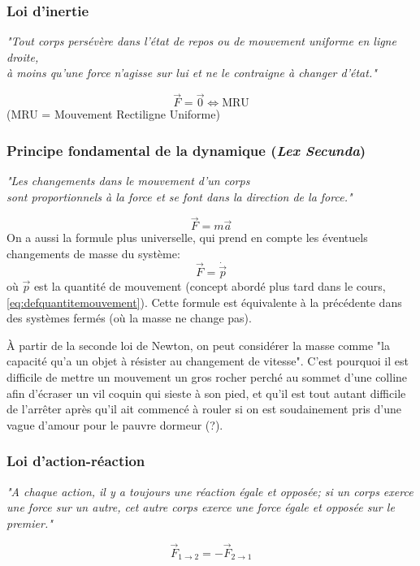 \documentclass{article}
\numberwithin{equation}{section}
\begin{document}
\subsubsection{Loi d'inertie}
\begin{center}
	\emph{"Tout corps persévère dans l'état de repos ou de mouvement uniforme en ligne droite, \\
	 à moins qu'une force n'agisse sur lui et ne le contraigne à changer d'état."}
\end{center}
\begin{equation}
	\boxed{\vec F = \vec 0 \Leftrightarrow \text{MRU}}
\end{equation}
(MRU = Mouvement Rectiligne Uniforme)

\subsubsection{Principe fondamental de la dynamique (\emph{Lex Secunda})}
\begin{center}
	\emph{"Les changements dans le mouvement d'un corps \\ sont proportionnels à la force et se font dans la direction de la force."}
\end{center}
\begin{equation} \label{eq:lexsecunda}
	\boxed{\vec F = m \vec a}
\end{equation}
On a aussi la formule plus universelle, qui prend en compte les éventuels changements de masse du système:
\begin{equation*}
	\boxed{ \vec F = \dot{\vec{p}} }
\end{equation*}
où \(\vec p\) est la quantité de mouvement (concept abordé plus tard dans le cours, \ref{eq:defquantitemouvement}). Cette formule est équivalente à la précédente dans des systèmes fermés (où la masse ne change pas).

À partir de la seconde loi de Newton, on peut considérer la masse comme "la capacité qu'a un objet à résister au changement de vitesse". C'est pourquoi il est difficile de mettre un mouvement un gros rocher perché au sommet d'une colline afin d'écraser un vil coquin qui sieste à son pied, et qu'il est tout autant difficile de l'arrêter après qu'il ait commencé à rouler si on est soudainement pris d'une vague d'amour pour le pauvre dormeur (?).

\subsubsection{Loi d'action-réaction}
\begin{center}
	\emph{"A chaque action, il y a toujours une réaction égale et opposée; si un corps exerce une force sur un autre, cet autre corps exerce une force égale et opposée sur le premier."}
\end{center}
\begin{equation}
	\boxed{\vec F_{1 \to 2} = - \vec F_{2 \to 1}}
\end{equation}
\end{document}
